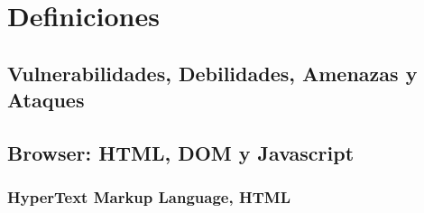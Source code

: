 \label{chap:chap2}

\section{Definiciones}
\label{sec:chap2.1}

\subsection{Vulnerabilidades, Debilidades, Amenazas y Ataques}
\label{sec:chap2.1.1-1}




\cite{ref1}

\subsection{Browser: HTML, DOM y Javascript}
\label{sec:chap2.1.1-2}


\subsubsection{HyperText Markup Language, HTML}
\label{sec:chap2.1.1.1}


